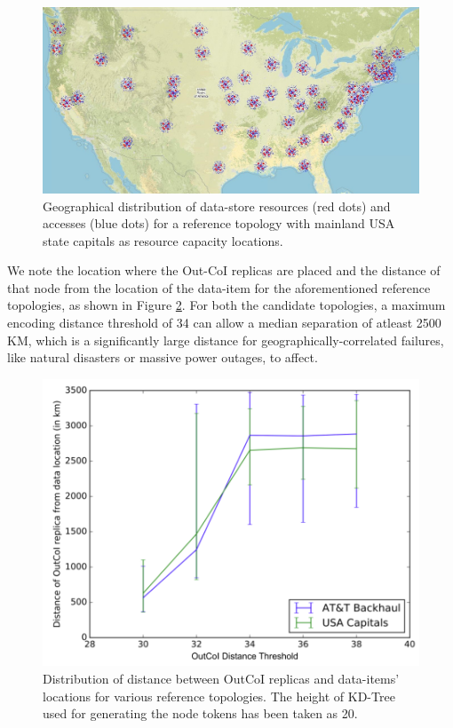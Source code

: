\begin{figure}[h]
\centering
\includegraphics[width=0.75\columnwidth]{figures/fogstore/evals/fault-tolerance/map_accesses.jpg}
\caption{Geographical distribution of data-store resources (red dots) and accesses (blue dots) for a reference topology with mainland USA state capitals as resource capacity locations.}
\label{fig:faultToleranceTopo}
\end{figure}
We note the location where the Out-CoI replicas are placed and the distance of that node from the location of the data-item for the aforementioned reference topologies, as shown in Figure \ref{fig:outCoiDistance}. For both the candidate topologies, a maximum encoding distance threshold of 34 can allow a median separation of atleast 2500 KM, which is a significantly large distance for geographically-correlated failures, like natural disasters or massive power outages, to affect.
\begin{figure}[h]
\centering
\includegraphics[width=0.75\columnwidth]{figures/fogstore/evals/fault-tolerance/outCoiDist.png}
\caption{Distribution of distance between OutCoI replicas and data-items' locations for various reference topologies. The height of KD-Tree used for generating the node tokens has been taken as 20.}
\label{fig:outCoiDistance}
\end{figure}

